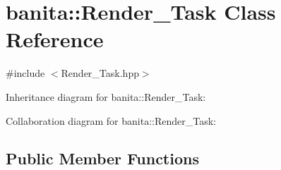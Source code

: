 \hypertarget{classbanita_1_1_render___task}{}\section{banita\+::Render\+\_\+\+Task Class Reference}
\label{classbanita_1_1_render___task}


{\ttfamily \#include $<$Render\+\_\+\+Task.\+hpp$>$}



Inheritance diagram for banita\+::Render\+\_\+\+Task\+:


Collaboration diagram for banita\+::Render\+\_\+\+Task\+:
\subsection*{Public Member Functions}
